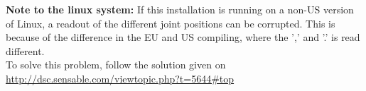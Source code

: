 \textbf{Note to the linux system:} If this installation is running on a non-US version of Linux, a readout of the different joint positions can be corrupted. This is because of the difference in the EU and US compiling, where the ',' and '.' is read different.\\
To solve this problem, follow the solution given on\\
\url{http://dsc.sensable.com/viewtopic.php?t=5644#top}


